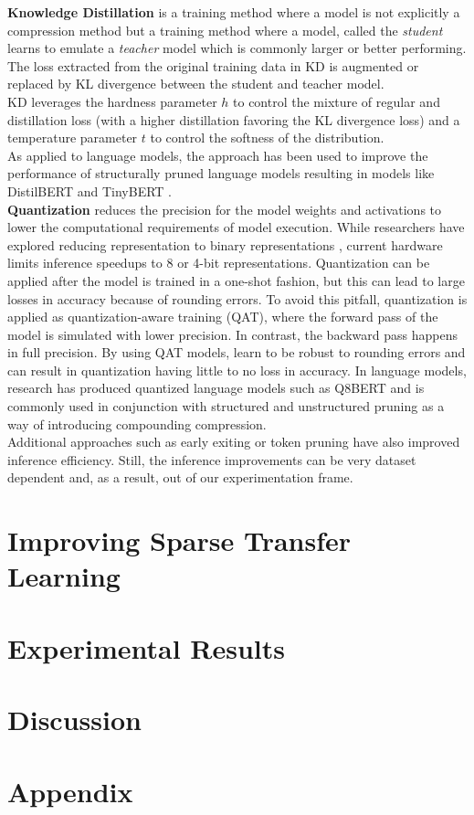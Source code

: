\documentclass[11pt]{article}
\begin{document}
\textbf{Knowledge Distillation} \cite{Hinton2015DistillingTK} is a training method where a model is not explicitly a compression method but a training method where a model, called the \textit{student} learns to emulate a \textit{teacher} model which is commonly larger or better performing. The loss extracted from the original training data in KD is augmented or replaced by KL divergence between the student and teacher model. \\
KD leverages the hardness parameter $h$ to control the mixture of regular and distillation loss (with a higher distillation favoring the KL divergence loss) and a temperature parameter $t$ to control the softness of the distribution. \\
As applied to language models, the approach has been used to improve the performance of structurally pruned language models resulting in models like DistilBERT \cite{sanh2019distilbert} and TinyBERT \cite{Jiao2020TinyBERTDB}. \\
\textbf{Quantization} reduces the precision for the model weights and activations to lower the computational requirements of model execution. While researchers have explored reducing representation to binary representations \cite{Pouransari2020LeastSB}, current hardware limits inference speedups to 8 or 4-bit representations. Quantization can be applied after the model is trained in a one-shot fashion, but this can lead to large losses in accuracy because of rounding errors. To avoid this pitfall, quantization is applied as quantization-aware training (QAT), where the forward pass of the model is simulated with lower precision. In contrast, the backward pass happens in full precision. By using QAT models, learn to be robust to rounding errors and can result in quantization having little to no loss in accuracy. In language models, research has produced quantized language models such as Q8BERT \cite{Zafrir2019Q8BERTQ8} and is commonly used in conjunction with structured and unstructured pruning \cite{Zafrir2021PruneOF} as a way of introducing compounding compression.\\
Additional approaches such as early exiting \cite{Xin2020DeeBERTDE} or token pruning \cite{Kim2021LearnedTP} have also improved inference efficiency. Still, the inference improvements can be very dataset dependent and, as a result, out of our experimentation frame. \\
\section{Improving Sparse Transfer Learning}

\section{Experimental Results}

\section{Discussion}



\appendix
\section{Appendix}

\end{document}
